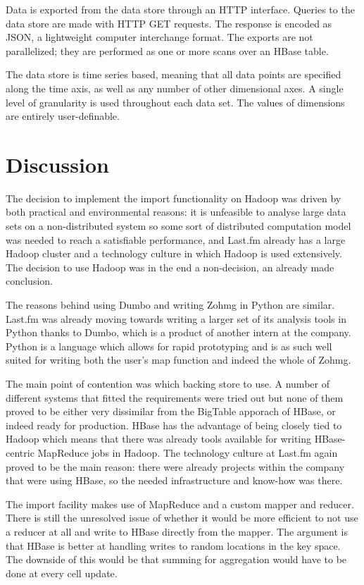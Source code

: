 Data is exported from the data store through an HTTP interface. Queries to the
data store are made with HTTP GET requests. The response is encoded as JSON, a
lightweight computer interchange format. The exports are not parallelized; they
are performed as one or more scans over an HBase table.

The data store is time series based, meaning that all data points are specified
along the time axis, as well as any number of other dimensional axes. A single
level of granularity is used throughout each data set. The values of dimensions
are entirely user-definable.


\section{Discussion}


The decision to implement the import functionality on Hadoop was driven by both
practical and environmental reasons: it is unfeasible to analyse large data sets
on a non-distributed system so some sort of distributed computation model was
needed to reach a satisfiable performance, and Last.fm already has a large
Hadoop cluster and a technology culture in which Hadoop is used extensively. The
decision to use Hadoop was in the end a non-decision, an already made
conclusion.

The reasons behind using Dumbo and writing Zohmg in Python are similar. Last.fm
was already moving towards writing a larger set of its analysis tools in Python
thanks to Dumbo, which is a product of another intern at the company. Python is
a language which allows for rapid prototyping and is as such well suited for
writing both the user's map function and indeed the whole of Zohmg.

The main point of contention was which backing store to use. A number of
different systems that fitted the requirements were tried out but none of them
proved to be either very dissimilar from the BigTable apporach of HBase, or
indeed ready for production. HBase has the advantage of being closely tied to
Hadoop which means that there was already tools available for writing
HBase-centric MapReduce jobs in Hadoop. The technology culture at Last.fm again
proved to be the main reason: there were already projects within the company
that were using HBase, so the needed infrastructure and know-how was there.

The import facility makes use of MapReduce and a custom mapper and reducer.
There is still the unresolved issue of whether it would be more efficient to not
use a reducer at all and write to HBase directly from the mapper. The argument
is that HBase is better at handling writes to random locations in the key space.
The downside of this would be that summing for aggregation would have to be done
at every cell update.

